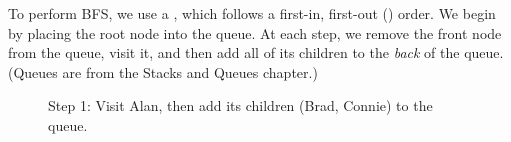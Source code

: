 To perform BFS, we use a , which follows a first-in, first-out () order. We begin by placing the root node into the queue. At each step, we remove the front node from the queue, visit it, and then add all of its children to the \emph{back} of the queue. (Queues are from the Stacks and Queues chapter.)

\begin{figure}[H]
    \centering

    \caption{Step 1: Visit Alan, then add its children (Brad, Connie) to the queue.}
\end{figure}

